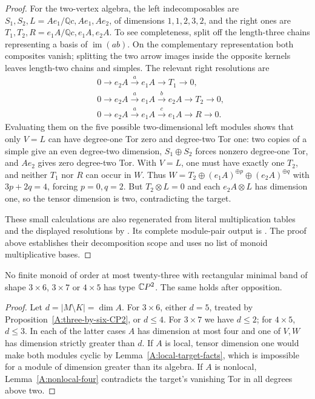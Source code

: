 \begin{proof}
For the two-vertex algebra, the left indecomposables
are $S_1,S_2,L=Ae_1/\mathbb Qc,Ae_1,Ae_2$, of
dimensions $1,1,2,3,2$, and the right ones are
$T_1,T_2,R=e_1A/\mathbb Qc,e_1A,e_2A$.
To see completeness, split off the length-three
chains representing a basis of $\operatorname{im}(ab)$.
On the complementary representation both composites
vanish; splitting the two arrow images inside the
opposite kernels leaves length-two chains and simples.
The relevant right resolutions are
\[
\begin{split}
 &0\to e_2A\xrightarrow{a}e_1A\to T_1\to0,\\
 &0\to e_2A\xrightarrow{a}e_1A\xrightarrow{b}e_2A
       \to T_2\to0,\\
 &0\to e_2A\xrightarrow{a}e_1A\xrightarrow{c}e_1A
       \to R\to0.
\end{split}
\]
Evaluating them on the five possible two-dimensional
left modules shows that only $V=L$ can have degree-one
Tor zero and degree-two Tor one: two copies of a simple
give an even degree-two dimension, $S_1\oplus S_2$
forces nonzero degree-one Tor, and $Ae_2$ gives zero
degree-two Tor. With $V=L$, one must have exactly
one $T_2$, and neither $T_1$ nor $R$ can occur in
$W$. Thus
$W=T_2\oplus(e_1A)^{\oplus p}\oplus(e_2A)^{\oplus q}$
with $3p+2q=4$, forcing $p=0,q=2$.
But $T_2\otimes L=0$ and each $e_2A\otimes L$
has dimension one, so the tensor dimension is two,
contradicting the target.

These small calculations are also regenerated from
literal multiplication tables and the displayed
resolutions by
.
Its complete module-pair output is
.
The proof above establishes their decomposition
scope and uses no list of monoid multiplicative bases.
\end{proof}

\begin{corollary}
\label{A:large-bands-through23}
No finite monoid of order at most twenty-three with
rectangular minimal band of shape $3\times6$, $3\times7$
or $4\times5$ has type $\mathbb{C}P^2$. The same holds after
opposition.
\end{corollary}
\begin{proof}
Let $d=|M\setminus K|=\dim A$. For $3\times6$,
either $d=5$, treated by Proposition~\ref{A:three-by-six-CP2},
or $d\leq4$. For $3\times7$ we have $d\leq2$;
for $4\times5$, $d\leq3$. In each of the latter
cases $A$ has dimension at most four and one of
$V,W$ has dimension strictly greater than $d$.
If $A$ is local, tensor dimension one would make
both modules cyclic by Lemma~\ref{A:local-target-facts},
which is impossible for a module of dimension greater
than its algebra. If $A$ is nonlocal,
Lemma~\ref{A:nonlocal-four} contradicts the target's
vanishing Tor in all degrees above two.
\end{proof}
